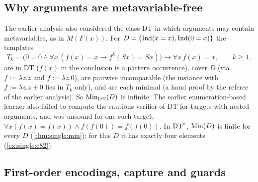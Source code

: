 \subsection{Why arguments are metavariable-free}\label{app:setting:nested}

\begin{remark}\label{rem:setting:nested}
The earlier analysis also considered the class $\mathrm{DT}$ in which arguments may contain metavariables, as in $M(F(x))$. For $D=\{\mathrm{Ind}(x=x),\mathrm{Ind}(0=x)\}$ the templates
\[T_k=\bigl(0=0\wedge\forall x\,(f(x)=x\to f^k(Sx)=Sx)\bigr)\to\forall x\,f(x)=x,\qquad k\ge1,\]
are in $\mathrm{DT}$ ($f(x)$ in the conclusion is a pattern occurrence), cover $D$ (via $f:=\lambda z.z$ and $f:=\lambda z.0$), are pairwise incomparable (the instance with $f:=\lambda z.z+0$ lies in $T_k$ only), and are each minimal (a hand proof by the referee of the earlier analysis). So $\mathrm{Min}_{\mathrm{DT}}(D)$ is infinite. The earlier enumeration-based learner also failed to compute the cautious verifier of $\mathrm{DT}$ for targets with nested arguments, and was unsound for one such target, $\forall x(f(x)=f(x))\wedge f(f(0))=f(f(0))$. In $\mathrm{DT}^{\circ}$, $\mathrm{Min}(D)$ is finite for every $D$ (\cref{thm:single:min}); for this $D$ it has exactly four elements (\cref{ex:single:c82}).
\end{remark}

\subsection{First-order encodings, capture and guards}\label{sec:setting:fo}

